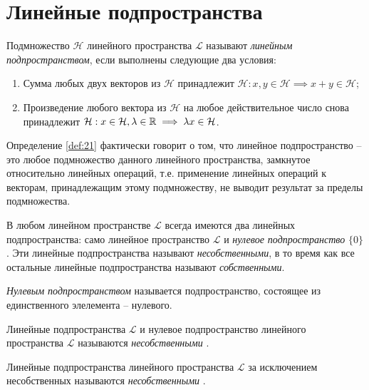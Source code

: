 \section{Линейные подпространства}

\begin{definition}\label{def:21}
  Подмножество $\mathcal{H}$ линейного пространства $\mathcal{L}$ называют \textit{линейным подпространством}, если выполнены следующие два условия:
  \begin{enumerate}
    \item Сумма любых двух векторов из $\mathcal{H}$ принадлежит $\mathcal{H}: x, y \in \mathcal{H} \implies x + y \in \mathcal{H}$;
    \item Произведение любого вектора из $\mathcal{H}$ на любое действительное число снова принадлежит $\mathcal{H}: x \in \mathcal{H}, \lambda \in \mathbb{R} \implies \lambda x \in \mathcal{H}$.
  \end{enumerate}
\end{definition}

Определение \ref{def:21} фактически говорит о том, что линейное подпространство -- это любое подмножество данного линейного пространства, замкнутое относительно линейных операций, т.е. применение линейных операций к векторам, принадлежащим этому подмножеству, не выводит результат за пределы подмножества.

В любом линейном пространстве $\mathcal{L}$ всегда имеются два линейных подпространства: само линейное пространство $\mathcal{L}$ и \textit{нулевое подпространство} $\{ 0 \}$. Эти линейные подпространства называют \textit{несобственными}, в то время как все остальные линейные подпространства называют \textit{собственными}.

\begin{definition}
  \textit{Нулевым подпространством} называется подпространство, состоящее из единственного элелемента -- нулевого.
\end{definition}

\begin{definition}
  Линейные подпространства $\mathcal{L}$ и нулевое подпространство линейного пространства $\mathcal{L}$ называются \textit{несобственными} .
\end{definition}

\begin{definition}
  Линейные подпространства линейного пространства $\mathcal{L}$ за исключением несобственных называются \textit{несобственными} .
\end{definition}


